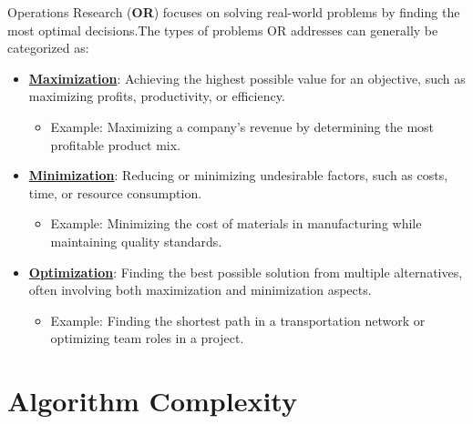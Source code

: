 \begin{tcolorbox}[title=Types of Problems]
Operations Research (\textbf{OR}) focuses on solving real-world problems by finding the most optimal decisions.The types of problems OR addresses can generally be categorized as:

\begin{itemize}
    \item \textbf{\underline{Maximization}}: Achieving the highest possible value for an objective, such as maximizing profits, productivity, or efficiency. 
        \begin{itemize}
            \item Example: Maximizing a company's revenue by determining the most profitable product mix.
        \end{itemize}
    
    \item \textbf{\underline{Minimization}}: Reducing or minimizing undesirable factors, such as costs, time, or resource consumption.
        \begin{itemize}
            \item Example: Minimizing the cost of materials in manufacturing while maintaining quality standards.
        \end{itemize}

    \item \textbf{\underline{Optimization}}: Finding the best possible solution from multiple alternatives, often involving both maximization and minimization aspects. 
        \begin{itemize}
            \item Example: Finding the shortest path in a transportation network or optimizing team roles in a project.
        \end{itemize}
\end{itemize}
\end{tcolorbox}

\section{Algorithm Complexity}

